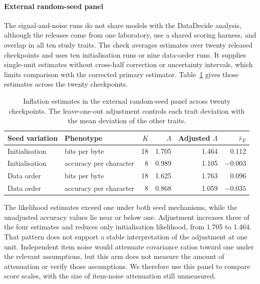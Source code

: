 \paragraph{External random-seed panel}
The signal-and-noise runs do not share models with the DataDecide analysis, although the releases come from one laboratory, use a shared scoring harness, and overlap in all ten study traits. The check averages estimates over twenty released checkpoints and uses ten initialisation runs or nine data-order runs. It supplies single-unit estimates without cross-half correction or uncertainty intervals, which limits comparison with the corrected primary estimator. Table~\ref{tab:original12} gives those estimates across the twenty checkpoints.

\begin{table}[!htb]
\centering
\caption{Inflation estimates in the external random-seed panel across twenty checkpoints. The leave-one-out adjustment controls each trait deviation with the mean deviation of the other traits.}
\label{tab:original12}
\small\setlength{\tabcolsep}{4pt}\renewcommand{\arraystretch}{1.12}
\begin{tabular}{llrrrr}\toprule
Seed variation & Phenotype & $K$ & $\Lambda$ & Adjusted $\Lambda$ & $\bar r_E$\\\midrule
Initialisation & bits per byte & 18 & 1.705 & 1.464 & 0.112\\
Initialisation & accuracy per character & 8 & 0.989 & 1.105 & $-0.003$\\
Data order & bits per byte & 18 & 1.625 & 1.763 & 0.096\\
Data order & accuracy per character & 8 & 0.868 & 1.059 & $-0.035$\\\bottomrule
\end{tabular}
\end{table}

The likelihood estimates exceed one under both seed mechanisms, while the unadjusted accuracy values lie near or below one. Adjustment increases three of the four estimates and reduces only initialisation likelihood, from 1.705 to 1.464. That pattern does not support a stable interpretation of the adjustment at one unit. Independent item noise would attenuate covariance ratios toward one under the relevant assumptions, but this arm does not measure the amount of attenuation or verify those assumptions. We therefore use this panel to compare score scales, with the size of item-noise attenuation still unmeasured.

